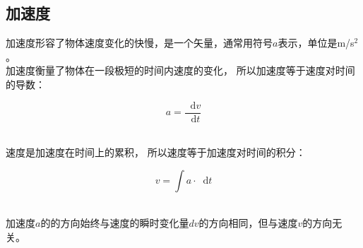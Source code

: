 \documentclass[UTF8]{ctexart}
\newcommand*{\dif}{\mathop{}\!\mathrm{d}}
\begin{document}
\subsection{加速度}
    加速度形容了物体速度变化的快慢，是一个矢量，通常用符号$a$表示，单位是m/s$^2$。\\[3mm]
    加速度衡量了物体在一段极短的时间内速度的变化，
    所以加速度等于速度对时间的导数：\\
    \begin{large}
        \begin{equation*}
            a=\frac{\dif v}{\dif t}
        \end{equation*}
    \end{large}\\
    速度是加速度在时间上的累积，
    所以速度等于加速度对时间的积分：\\
    \begin{large}
        \begin{equation*}
            v=\int a\cdot\dif t
        \end{equation*}
    \end{large}\\
    加速度$a$的的方向始终与速度的瞬时变化量$dv$的方向相同，但与速度$v$的方向无关。

\newpage
\end{document}
